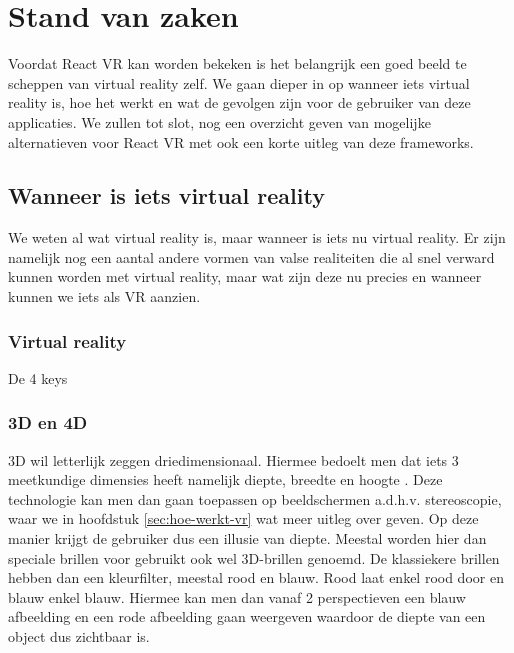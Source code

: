 \chapter{Stand van zaken}
\label{ch:stand-van-zaken}



Voordat React VR kan worden bekeken is het belangrijk een goed beeld te scheppen van virtual reality zelf. We gaan dieper in op wanneer iets virtual reality is, hoe het werkt en wat de gevolgen zijn voor de gebruiker van deze applicaties. We zullen tot slot, nog een overzicht geven van mogelijke alternatieven voor React VR met ook een korte uitleg van deze frameworks.

\section{Wanneer is iets virtual reality}
\label{sec:wanner-vr}
We weten al wat virtual reality is, maar wanneer is iets nu virtual reality. Er zijn namelijk nog een aantal andere vormen van valse realiteiten die al snel verward kunnen worden met virtual reality, maar wat zijn deze nu precies en wanneer kunnen we iets als VR aanzien.

\subsection{Virtual reality}
\label{subsec:virtual-reality}
\autocite{Sherman2000}
De 4 keys

\subsection{3D en 4D}
\label{subsec:3d-4d}
3D wil letterlijk zeggen driedimensionaal. Hiermee bedoelt men dat iets 3 meetkundige dimensies heeft namelijk diepte, breedte en hoogte \autocite{Wikipedia3D2018}. Deze technologie kan men dan gaan toepassen op beeldschermen a.d.h.v. stereoscopie, waar we in hoofdstuk \ref{sec:hoe-werkt-vr} wat meer uitleg over geven. Op deze manier krijgt de gebruiker dus een illusie van diepte. Meestal worden hier dan speciale brillen voor gebruikt ook wel 3D-brillen genoemd. De klassiekere brillen hebben dan een kleurfilter, meestal rood en blauw. Rood laat enkel rood door en blauw enkel blauw. Hiermee kan men dan vanaf 2 perspectieven een blauw afbeelding en een rode afbeelding gaan weergeven waardoor de diepte van een object dus zichtbaar is.

